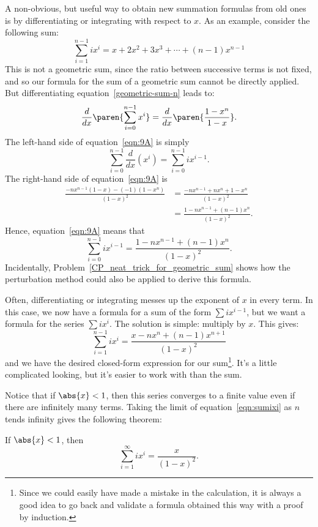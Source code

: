 A non-obvious, but useful way to obtain new summation formulas from
old ones is by differentiating or integrating with respect to $x$.  As
an example, consider the following sum:
\[
\sum_{i=1}^{n-1} i x^i = x + 2 x^2 + 3 x^3 + \cdots + (n - 1) x^{n -
  1}
\]
This is not a geometric sum, since the ratio between successive terms
is not fixed, and so our formula for the sum of a geometric sum cannot
be directly applied.  But differentiating
equation~\ref{geometric-sum-n} leads
to:
\begin{equation}\label{eqn:9A}
\frac{d}{dx} \paren{ \sum_{i = 0}^{n - 1} x^i }
   = \frac{d}{dx} \paren{ \frac{1 - x^n}{1 - x} }.
\end{equation}
The left-hand side of equation~\ref{eqn:9A} is simply
\[
\sum_{i = 0}^{n - 1} \frac{d}{dx} (x^i)
    = \sum_{i = 0}^{n - 1} i x^{i - 1}.
\]
The right-hand side of equation~\ref{eqn:9A} is
\begin{align*}
\frac{ -n x^{n - 1} (1 - x) - (-1) (1 - x^n) }{ (1 - x)^2 }
    &= \frac{ -n x^{n - 1} + n x^n + 1 - x^n }{ (1 - x)^2 } \\
    &= \frac{1 - n x^{n - 1} + (n - 1) x^n}{ (1 - x)^2 }.
\end{align*}
Hence, equation~\ref{eqn:9A} means that
\[
\sum_{i = 0}^{n - 1} i x^{i - 1}
    = \frac{1 - n x^{n - 1} + (n - 1) x^n}{ (1 - x)^2 }.
\]
Incidentally, Problem~\ref{CP_neat_trick_for_geometric_sum} shows how
the perturbation method could also be applied to derive this formula.

Often, differentiating or integrating messes up the exponent of $x$ in
every term.  In this case, we now have a formula for a sum of the form
$\sum i x^{i-1}$, but we want a formula for the series $\sum i x^i$.
The solution is simple: multiply by $x$.  This gives:
\begin{equation}\label{eqn:sumixi}
    \sum_{i=1}^{n - 1} i x^i = \frac{ x - n x^n + (n - 1) x^{n+1}}{(1 - x)^2}
\end{equation}
and we have the desired closed-form expression for our
sum\footnote{Since we could easily have made a mistake in the
  calculation, it is always a good idea to go back and validate a
  formula obtained this way with a proof by induction.}.  It's a
little complicated looking, but it's easier to work with than the sum.

Notice that if $\abs{x} < 1$, then this series converges to a finite
value even if there are infinitely many terms.  Taking the limit of
equation~\ref{eqn:sumixi} as $n$ tends infinity gives the following
theorem:
\begin{theorem}\label{th:inf_ixi}
If $\abs{x} < 1$, then
\begin{equation}\label{eqn:inf_ixi}
    \sum_{i=1}^\infty i x^i = \frac{x}{(1-x)^2}.
\end{equation}
\end{theorem}

